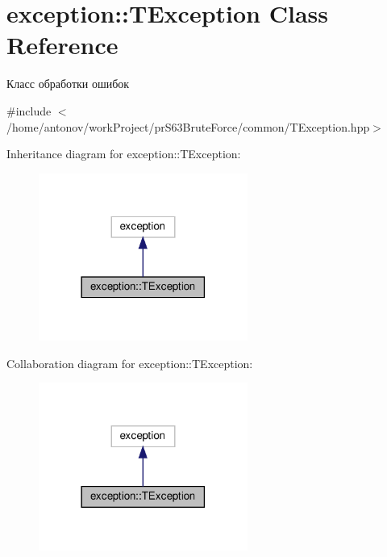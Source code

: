 \hypertarget{classexception_1_1_t_exception}{}\section{exception\+:\+:T\+Exception Class Reference}
\label{classexception_1_1_t_exception}


Класс обработки ошибок  




{\ttfamily \#include $<$/home/antonov/work\+Project/pr\+S63\+Brute\+Force/common/\+T\+Exception.\+hpp$>$}



Inheritance diagram for exception\+:\+:T\+Exception\+:\nopagebreak
\begin{figure}[H]
\begin{center}
\leavevmode
\includegraphics[width=194pt]{classexception_1_1_t_exception__inherit__graph}
\end{center}
\end{figure}


Collaboration diagram for exception\+:\+:T\+Exception\+:\nopagebreak
\begin{figure}[H]
\begin{center}
\leavevmode
\includegraphics[width=194pt]{classexception_1_1_t_exception__coll__graph}
\end{center}
\end{figure}
